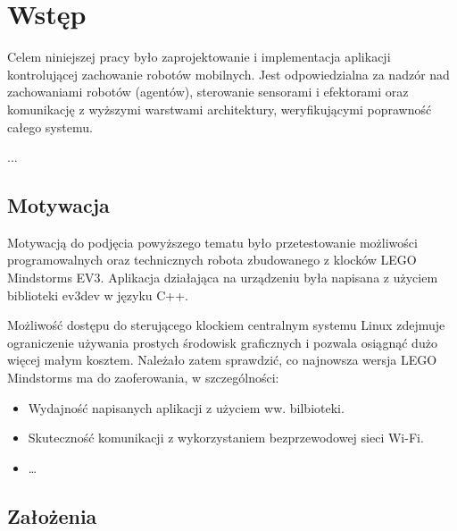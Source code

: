 \chapter{Wstęp}
\label{ch:wstep}

Celem niniejszej pracy było zaprojektowanie i implementacja aplikacji kontrolującej zachowanie robotów mobilnych. Jest odpowiedzialna za nadzór nad zachowaniami robotów (agentów), sterowanie sensorami i efektorami oraz komunikację z wyższymi warstwami architektury, weryfikującymi poprawność całego systemu.

...


\section{Motywacja}

Motywacją do podjęcia powyższego tematu było przetestowanie możliwości programowalnych oraz technicznych robota zbudowanego z klocków LEGO Mindstorms EV3. Aplikacja działająca na urządzeniu była napisana z użyciem biblioteki ev3dev \cite{ev3dev} w języku C++.

Możliwość dostępu do sterującego klockiem centralnym systemu Linux zdejmuje ograniczenie używania prostych środowisk graficznych i pozwala osiągnąć dużo więcej małym kosztem. Należało zatem sprawdzić, co najnowsza wersja LEGO Mindstorms ma do zaoferowania, w szczególności:
\begin{itemize}
    \item Wydajność napisanych aplikacji z użyciem ww. bilbioteki.
    \item Skuteczność komunikacji z wykorzystaniem bezprzewodowej sieci Wi-Fi.
    \item \dots
\end{itemize}

\section{Założenia}

